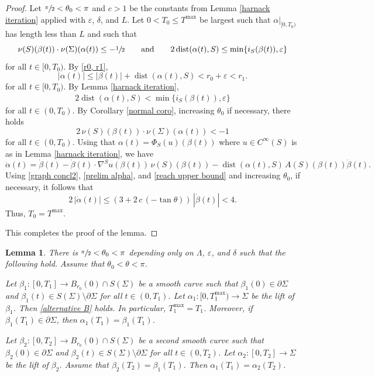 \documentclass[11pt]{amsart}
\newtheorem{lem}[prop]{Lemma}
\begin{document}
	\begin{proof} 
		Let $\sfrac{\pi}2<\theta_0<\pi$ and $c>1$ be the constants from Lemma \ref{harnack iteration} applied with $\varepsilon$, $\delta$, and $L$. 
		Let $0<T_0\leq  T^{\max}$ be largest such that $\alpha|_{[0,T_0)}$ has length less than $L$ and such that  
		$$\nu(S)(\beta(t))\cdot \nu(\Sigma)(\alpha(t))\leq -\sfrac12\qquad\text{and}\qquad  2\operatorname{dist}(\alpha(t),S)\leq \min\{i_S(\beta(t)),\varepsilon\}$$ for all $t\in[0,T_0)$. 
		 By \eqref{r0, r1},
		$$
		|\alpha(t)|\leq |\beta(t)|+\operatorname{dist}(\alpha(t),S)< r_0+\varepsilon<r_1.
		$$  
for all $t\in[0,T_0)$.		By Lemma \ref{harnack iteration}, 
		\begin{align} \label{prelim alpha}
		2\operatorname{dist}(\alpha(t),S)< \min\{i_S(\beta(t)),\varepsilon\}
		\end{align}  for all $t\in(0,T_0)$. By Corollary \ref{normal coro}, increasing $\theta_0$ if necessary, there holds 
		$$
		2\,\nu(S)(\beta(t))\cdot \nu(\Sigma)(\alpha(t))< -1
		$$
for all $t\in(0,T_0)$. Using that $\alpha(t)=\Phi_S(u)(\beta(t))$ where $u\in C^\infty(S)$ is as in Lemma \ref{harnack iteration}, we have
		 $$
		 \dot\alpha(t)=\dot\beta(t)-\dot\beta(t)\cdot \nabla^Su(\beta(t))\,\nu(S)(\beta(t))-\operatorname{dist}(\alpha(t),S)\,A(S)(\beta(t))\dot\beta(t).
		 $$
		 Using 		 \eqref{graph concl2}, \eqref{prelim alpha}, and \eqref{reach upper bound} and increasing $\theta_0$, if necessary, it follows that
		$$
		2\,|\dot \alpha(t)|\leq (3+2\,c\,(-\tan\theta))\,|\dot \beta(t)|<4.
		$$
		Thus,  $T_0=T^{\max}$.
		
		This completes the proof of the lemma.
	\end{proof}
		\begin{lem} \label{global lift}
			There is $\sfrac{\pi}2<\theta_0<\pi$  depending only on $\Lambda$, $\varepsilon$, and $\delta$ such that the following hold.	Assume that $\theta_0<\theta<\pi$.
			
	Let $\beta_1:[0, T_1]\to B_{r_0}(0)\cap S(\Sigma)$ be a smooth curve such that $\beta_1(0)\in \partial \Sigma$ and $\beta_1(t)\in S(\Sigma)\setminus \partial \Sigma$ for all  $t\in (0, T_1)$. Let $\alpha_1:[0,T^{\max}_1)\to \Sigma$ be the lift of $\beta_1$. Then \eqref{alternative B} holds. In particular,  $T^{\max}_1= T_1$. Moreover, if $\beta_1(T_1)\in \partial \Sigma$, then $\alpha_1(T_1)=\beta_1(T_1)$. 
	
	Let $\beta_2:[0,T_2]\to  B_{r_0}(0)\cap S(\Sigma)$ be a second smooth curve such that $\beta_2(0)\in \partial \Sigma$ and $\beta_2(t)\in S(\Sigma)\setminus \partial \Sigma$ for all  $t\in (0,T_2)$. Let $\alpha_2:[0,T_2]\to \Sigma$ be the lift of $\beta_2$. Assume that  $\beta_2(T_2)=\beta_1(T_1)$.  Then $\alpha_1(T_1)=\alpha_2(T_2)$.
	\end{lem}
\end{document}
